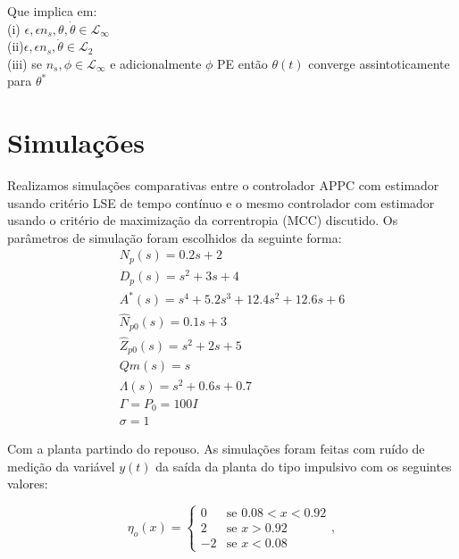 \documentclass[conference,harvard,brazil,english]{sbatex}
\begin{document}
Que implica em:\\
\flushleft
(i) $\epsilon, \epsilon n_s, \theta, \dot{\theta} \in \mathcal{L}_\infty$\\
(ii)$ \epsilon, \epsilon n_s, \dot{\theta} \in \mathcal{L}_2$\\
(iii) se $n_s, \phi \in \mathcal{L}_\infty$ e adicionalmente $\phi$ PE então $\theta(t)$ converge assintoticamente para $\theta^*$


\section{Simulações}



Realizamos simulações comparativas entre o controlador APPC com estimador usando critério LSE de tempo contínuo e o mesmo controlador com estimador usando o critério de maximização da correntropia (MCC) discutido. Os parâmetros de simulação foram escolhidos da seguinte forma:
\begin{equation}
\label{eq:Distribuição do ruído}
\displaystyle 
\begin{array}{l}
       N_p(s)          = 0.2s+2\\
       D_p(s)          = s^2+3s+4\\
       A^*(s)          = s^4+5.2s^3+12.4s^2+12.6s+6\\
       \hat{N}_{p0}(s) = 0.1s+3  \\
       \hat{Z}_{p0}(s) = s^2+2s+5\\
       Qm(s)           = s       \\ 
       \Lambda(s)      = s^2+0.6s+0.7\\
       \Gamma = P_0 = 100I \\
       \sigma = 1
\end{array}
\end{equation}

Com a planta partindo do repouso. As simulações foram feitas com ruído de medição da variável $y(t)$ da saída da planta do tipo impulsivo com os seguintes valores:

\begin{equation}
\label{eq:Distribuição do ruído}
\displaystyle \eta_o(x) = \left\{
\begin{array}{rl}
       0 &\mbox{se $0.08<x<0.92$} \\
       2 &\mbox{se $x>0.92$}      \\
      -2 &\mbox{se $x<0.08$}      
\end{array}, \right.
\end{equation}
\end{document}
